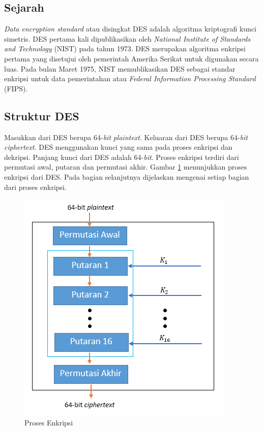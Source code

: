\subsection{Sejarah}

\textit{Data encryption standard} atau disingkat DES adalah algoritma kriptografi kunci simetris. DES pertama kali dipublikasikan oleh \textit{National Institute of Standards and Technology} (NIST) pada tahun 1973. DES merupakan algoritma enkripsi pertama yang disetujui oleh pemerintah Amerika Serikat untuk digunakan secara luas. Pada bulan Maret 1975, NIST memublikasikan DES sebagai standar enkripsi untuk data pemerintahan atau \textit{Federal Information Processing Standard} (FIPS).

\subsection{Struktur DES}

Masukkan dari DES berupa 64-\textit{bit} \textit{plaintext}. Keluaran dari DES berupa 64-\textit{bit} \textit{ciphertext}. DES menggunakan kunci yang sama pada proses enkripsi dan dekripsi. Panjang kunci dari DES adalah 64-\textit{bit}. Proses enkripsi terdiri dari permutasi awal, putaran dan permutasi akhir. Gambar \ref{fig:prosesenkripsi} menunjukkan proses enkripsi dari DES. Pada bagian selanjutnya dijelaskan mengenai setiap bagian dari proses enkripsi.

\begin{figure}[H]
	\includegraphics[scale=0.8]{Gambar/proses_enkripsi_des}
	\centering
	\caption{Proses Enkripsi}\label{fig:prosesenkripsi}
\end{figure}

